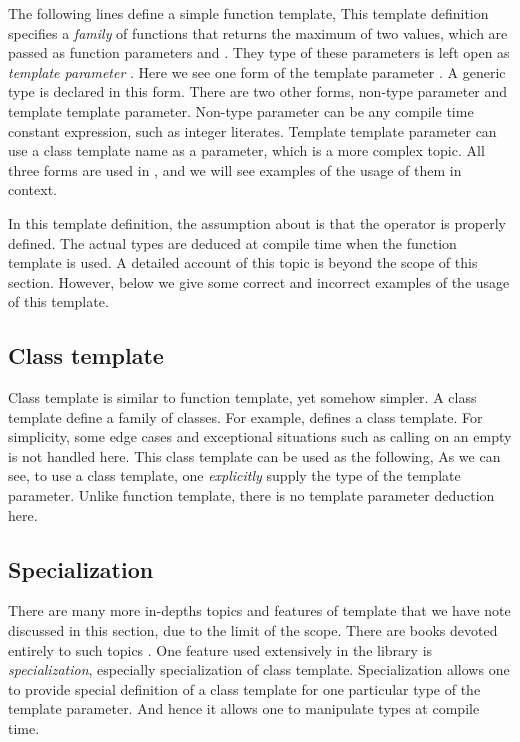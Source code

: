 The following lines define a simple function template,
This template definition specifies a \emph{family} of functions that returns
the maximum of two values, which are passed as function parameters
 and . They type of these parameters is left open as
\emph{template parameter} . Here we see one form of the template
parameter . A generic type is declared in this form.
There are two other forms, non-type parameter and template template parameter.
Non-type parameter can be any compile time constant expression, such as
integer literates. Template template parameter can use a class template name
as a parameter, which is a more complex topic. All three forms are used in
\vsmc, and we will see examples of the usage of them in context.

In this template definition, the assumption about  is that the
operator \cppinline{<} is properly defined. The actual types are deduced at
compile time when the function template is used. A detailed account of this
topic is beyond the scope of this section. However, below we give some correct
and incorrect examples of the usage of this template.

\subsection{Class template}
\label{sub:Class template}

Class template is similar to function template, yet somehow simpler. A class
template define a family of classes. For example,
defines a  class template. For simplicity, some edge cases
and exceptional situations such as calling  on an empty
 is not handled here. This class template can be used as the
following,
As we can see, to use a class template, one \emph{explicitly} supply the type
of the template parameter. Unlike function template, there is no template
parameter deduction here.

\subsection{Specialization}
\label{sub:Specialization}

There are many more in-depths topics and features of \cpp template that we
have note discussed in this section, due to the limit of the scope. There are
books devoted entirely to such topics \cite{cpptemplate, moderncpp}. One
feature used extensively in the \vsmc library is \emph{specialization},
especially specialization of class template. Specialization allows one to
provide special definition of a class template for one particular type of the
template parameter. And hence it allows one to manipulate types at compile
time.

